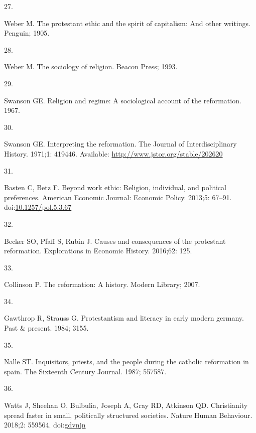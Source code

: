 \documentclass[
  singlecolumn]{article}
\newlength{\cslhangindent}
\newlength{\csllabelwidth}
\newlength{\cslentryspacingunit} %
\newenvironment{CSLReferences}[2] %
 {%
  \setlength{\parindent}{0pt}
  \ifodd #1
  \let\oldpar\par
  \def\par{\hangindent=\cslhangindent\oldpar}
  \fi
  \setlength{\parskip}{#2\cslentryspacingunit}
 }%
 {}
\newcommand{\CSLLeftMargin}[1]{\parbox[t]{\csllabelwidth}{#1}}
\newcommand{\CSLRightInline}[1]{\parbox[t]{\linewidth - \csllabelwidth}{#1}\break}
\begin{document}
\begin{CSLReferences}{0}{0}
\leavevmode{}%
\CSLLeftMargin{27. }%
\CSLRightInline{Weber M. The protestant ethic and the spirit of
capitalism: And other writings. Penguin; 1905. }

\leavevmode{}%
\CSLLeftMargin{28. }%
\CSLRightInline{Weber M. The sociology of religion. Beacon Press; 1993.
}

\leavevmode{}%
\CSLLeftMargin{29. }%
\CSLRightInline{Swanson GE. Religion and regime: A sociological account
of the reformation. 1967. }

\leavevmode{}%
\CSLLeftMargin{30. }%
\CSLRightInline{Swanson GE. Interpreting the reformation. The Journal of
Interdisciplinary History. 1971;1: 419446. Available:
\url{http://www.jstor.org/stable/202620}}

\leavevmode{}%
\CSLLeftMargin{31. }%
\CSLRightInline{Basten C, Betz F. Beyond work ethic: Religion,
individual, and political preferences. American Economic Journal:
Economic Policy. 2013;5: 67--91.
doi:\href{https://doi.org/10.1257/pol.5.3.67}{10.1257/pol.5.3.67}}

\leavevmode{}%
\CSLLeftMargin{32. }%
\CSLRightInline{Becker SO, Pfaff S, Rubin J. Causes and consequences of
the protestant reformation. Explorations in Economic History. 2016;62:
125. }

\leavevmode{}%
\CSLLeftMargin{33. }%
\CSLRightInline{Collinson P. The reformation: A history. Modern Library;
2007. }

\leavevmode{}%
\CSLLeftMargin{34. }%
\CSLRightInline{Gawthrop R, Strauss G. Protestantism and literacy in
early modern germany. Past \& present. 1984; 3155. }

\leavevmode{}%
\CSLLeftMargin{35. }%
\CSLRightInline{Nalle ST. Inquisitors, priests, and the people during
the catholic reformation in spain. The Sixteenth Century Journal. 1987;
557587. }

\leavevmode{}%
\CSLLeftMargin{36. }%
\CSLRightInline{Watts J, Sheehan O, Bulbulia, Joseph A, Gray RD,
Atkinson QD. Christianity spread faster in small, politically structured
societies. Nature Human Behaviour. 2018;2: 559564.
doi:\href{https://doi.org/gdvnjn}{gdvnjn}}


\end{CSLReferences}
\end{document}
